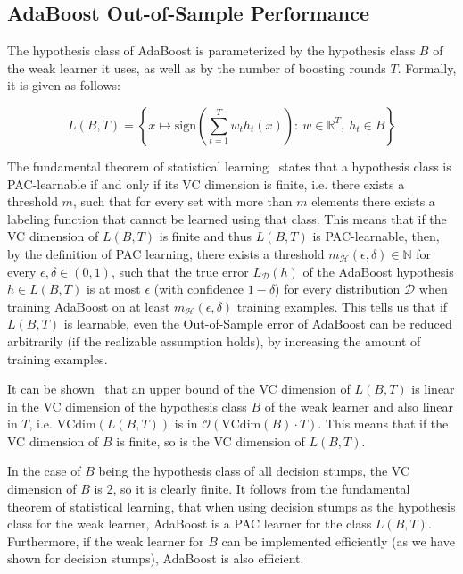 \subsection{AdaBoost Out-of-Sample Performance}
\label{sec:vcdim}

The hypothesis class of AdaBoost is parameterized by the hypothesis class $B$ of the weak learner it uses, as well as by
the number of boosting rounds $T$. Formally, it is given as follows:
\begin{linenomath*}
    $$
    L(B, T) = \left \{ x \mapsto \text{sign} \left( \sum_{t=1}^T w_t h_t(x) \right): \ 
        w \in \mathbb{R}^T, \  h_t \in B \right \}
    $$
\end{linenomath*}

The fundamental theorem of statistical learning~\cite[chapter 6]{SSBD14} states that a hypothesis class is PAC-learnable
if and only if its VC dimension is finite, i.e. there exists a threshold $m$, such that for every set with more than
$m$ elements there exists a labeling function that cannot be learned using that class.
This means that if the VC dimension of $L(B, T)$ is finite and thus $L(B, T)$ is PAC-learnable, then, by the definition
of PAC learning, there exists a threshold 
$m_\mathcal{H}(\epsilon, \delta) \in \mathbb{N}$ for every $\epsilon, \delta \in (0, 1)$, 
such that the true error $L_\mathcal{D}(h)$ of the AdaBoost hypothesis $h \in L(B, T)$ is at most $\epsilon$
(with confidence $1-\delta$)
for every distribution $\mathcal{D}$ when training AdaBoost on at least $m_\mathcal{H}(\epsilon, \delta)$ training
examples. This tells us that if $L(B, T)$ is learnable, even the Out-of-Sample error of AdaBoost can be reduced
arbitrarily (if the realizable assumption holds), by increasing the amount of training examples.

It can be shown~\cite{SSBD14} that an upper bound of the VC dimension of $L(B, T)$ 
is linear in the VC dimension of the hypothesis
class $B$ of the weak learner and also linear in $T$, i.e. $\text{VCdim}(L(B, T))$ is in
$\mathcal{O}(\text{VCdim}(B) \cdot T)$.
This means that if the VC dimension of $B$ is finite, so is the VC dimension of $L(B, T)$.

In the case of $B$ being the hypothesis class of all decision stumps, the VC dimension of $B$ is 2,
so it is clearly finite.
It follows from the fundamental theorem of statistical learning, that when using decision stumps as the hypothesis
class for the weak learner, AdaBoost is a PAC learner for the class $L(B, T)$.
Furthermore, if the weak learner for $B$ can be implemented efficiently (as we have shown for decision stumps), AdaBoost
is also efficient.


